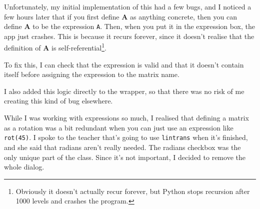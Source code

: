 \documentclass[../development.tex]{subfiles}
\begin{document}
Unfortunately, my initial implementation of this had a few bugs, and I noticed a few hours later that if you first define $\mathbf{A}$ as anything concrete, then you can define $\mathbf{A}$ to be the expression \texttt{A}. Then, when you put it in the expression box, the app just crashes. This is because it recurs forever, since it doesn't realise that the definition of $\mathbf{A}$ is self-referential\footnote{Obviously it doesn't actually recur forever, but Python stops recursion after 1000 levels and crashes the program.}.

To fix this, I can check that the expression is valid and that it doesn't contain itself before assigning the expression to the matrix name.


I also added this logic directly to the wrapper, so that there was no risk of me creating this kind of bug elsewhere.


While I was working with expressions so much, I realised that defining a matrix as a rotation was a bit redundant when you can just use an expression like \texttt{rot(45)}. I spoke to the teacher that's going to use \texttt{lintrans} when it's finished, and she said that radians aren't really needed. The radians checkbox was the only unique part of the  class. Since it's not important, I decided to remove the whole dialog.
\end{document}
